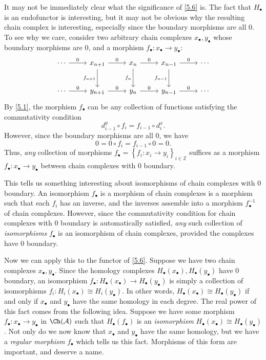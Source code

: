 \begin{remark}\label{5.7}
	It may not be immediately clear what the significance of \cref{5.6} is. The fact that $H_{\bullet} $ is an endofunctor is interesting, but it may not be obvious why the resulting chain complex is interesting, especially since the boundary morphisms are all 0. To see why we care, consider two arbitrary chain complexes $x_{\bullet} ,y_{\bullet} $ whose boundary morphisms are 0, and a morphism $f_{\bullet} : x_{\bullet}  \to y_{\bullet} $:
	\[\begin{tikzcd}[row sep = 2.5em, column sep = 2.5em]
	\cdots\ar[" 0 ", r]  & x_{n+1} \ar[" 0 ", r] \ar[" f_{n+1} "', d]  & x_n\ar[" 0 ", r] \ar[" f_n "', d]  & x_{n-1}\ar[" f_{n-1}  "', d]  \ar[" 0 ", r]  & \cdots \\
	\cdots\ar[" 0 ", r]  & y_{n+1} \ar[" 0 ", r]  & y_n\ar[" 0 ", r]  & y_{n-1} \ar[" 0 ", r]  & \cdots
	\end{tikzcd}\]
	By \cref{5.1}, the morphism $f_{\bullet} $ can be any collection of functions satisfying the commutativity condition
	\[
		d^y_{i-1} \circ f_i=f_{i-1} \circ d^x_i
	.\]
	However, since the boundary morphisms are all 0, we have
	\[
		0=0\circ f_i=f_{i-1} \circ 0=0
	.\]
	Thus, \emph{any} collection of morphisms $f_{\bullet} =\left\{ f_i : x_i \to y_i \right\}_{i\in\mathbb{Z} } $ suffices as a morphism $f_{\bullet} : x_{\bullet}  \to y_{\bullet} $ between chain complexes with 0 boundary.

	This tells us something interesting about isomorphisms of chain complexes with 0 boundary. An isomorphism $f_{\bullet} $ is a morphism of chain complexes is a morphism such that each $f_i$ has an inverse, and the inverses assemble into a morphism $f_{\bullet} ^{-1} $ of chain complexes. However, since the commutativity condition for chain complexes with 0 boundary is automatically satisfied, \emph{any} such collection of \emph{isomorphisms} $f_{\bullet} $ is an isomorphism of chain complexes, provided the complexes have 0 boundary.

	Now we can apply this to the functor of \cref{5.6}. Suppose we have two chain complexes $x_{\bullet} ,y_{\bullet} $. Since the homology complexes $H_{\bullet} (x_{\bullet} ),H_{\bullet} (y_{\bullet} )$ have 0 boundary, an isomorphism $f_{\bullet} : H_{\bullet} (x_{\bullet} ) \to H_{\bullet} (y_{\bullet} )$ is simply a collection of isomorphisms $f_i : H_i(x_{\bullet} ) \cong H_i(y_{\bullet} )$. In other words, $H_{\bullet} (x_{\bullet} )\cong H_{\bullet} (y_{\bullet} )$ if and only if $x_{\bullet} $ and $y_{\bullet} $ have the same homology in each degree. The real power of this fact comes from the following idea. Suppose we have some morphism $f_{\bullet} : x_{\bullet}  \to y_{\bullet} $ in $\Ch(\mathcal{A} ) $ such that $H_{\bullet} (f_{\bullet} )$ is an \emph{isomorphism} $H_{\bullet} (x_{\bullet} )\cong H_{\bullet} (y_{\bullet} )$. Not only do we now know that $x_{\bullet} $ and $y_{\bullet} $ have the same homology, but we have a \emph{regular morphism} $f_{\bullet} $ which tells us this fact. Morphisms of this form are important, and deserve a name.
\end{remark}

